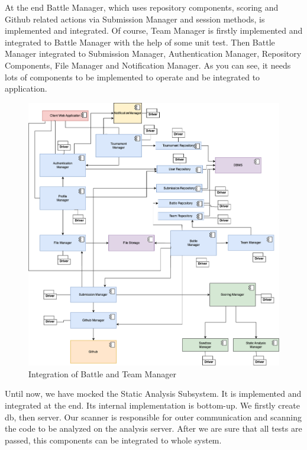 \newpage
\indent At the end Battle Manager, which uses repository components, scoring and Github related actions via Submission Manager and session methods, is implemented and integrated. Of course, Team Manager is firstly implemented and integrated to Battle Manager with the help of  some unit test. Then Battle Manager integrated to Submission Manager, Authentication Manager, Repository Components, File Manager and Notification Manager. As you can see, it needs lots of components to be implemented to  operate and be integrated to application. 

\begin{figure}[H]
    \centering
    \includegraphics[width=\linewidth]{Images/integration/integration_9.drawio.png}
    \caption{Integration of Battle and Team Manager}
\end{figure}

\newpage
\indent Until now, we have mocked the Static Analysis Subsystem. It is implemented and integrated at the end. Its internal implementation is bottom-up. We firstly create db, then server. Our scanner is responsible for outer communication and scanning the code to be analyzed on the analysis server. After we are sure that all tests are passed, this components can be integrated to whole system. 

